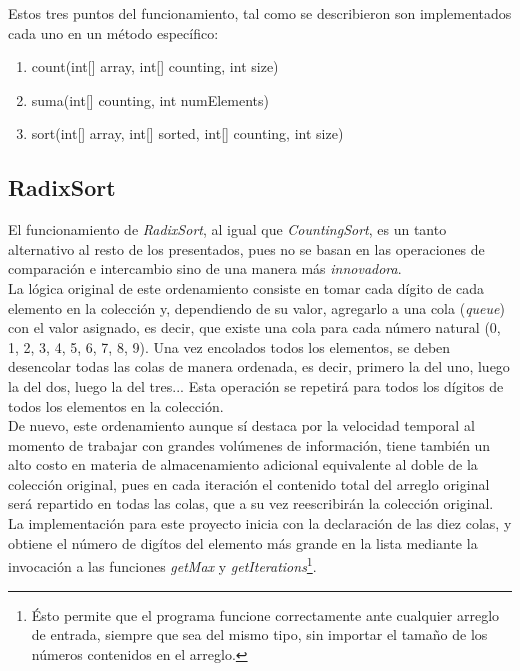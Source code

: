 \documentclass[a4paper,12pt]{article}
\begin{document}
Estos tres puntos del funcionamiento, tal como se describieron son implementados cada uno en un método específico:

\begin{enumerate}
    \item count(int[] array, int[] counting, int size)
    \item suma(int[] counting, int numElements)
    \item sort(int[] array, int[] sorted, int[] counting, int size)
\end{enumerate}

\subsection{RadixSort}

El funcionamiento de \textit{RadixSort}, al igual que \textit{CountingSort}, es un tanto alternativo al resto de los presentados, pues no se basan en las operaciones de comparación e intercambio sino de una manera más \textit{innovadora}.\\

La lógica original de este ordenamiento consiste en tomar cada dígito de cada elemento en la colección y, dependiendo de su valor, agregarlo a una cola (\textit{queue}) con el valor asignado, es decir, que existe una cola para cada número natural (0, 1, 2, 3, 4, 5, 6, 7, 8, 9). Una vez encolados todos los elementos, se deben desencolar todas las colas de manera ordenada, es decir, primero la del uno, luego la del dos, luego la del tres... Esta operación se repetirá para todos los dígitos de todos los elementos en la colección.\\

De nuevo, este ordenamiento aunque sí destaca por la velocidad temporal al momento de trabajar con grandes volúmenes de información, tiene también un alto costo en materia de almacenamiento adicional equivalente al doble de la colección original, pues en cada iteración el contenido total del arreglo original será repartido en todas las colas, que a su vez reescribirán la colección original.\\

La implementación para este proyecto inicia con la declaración de las diez colas, y obtiene el número de digítos del elemento más grande en la lista mediante la invocación a las funciones \textit{getMax} y \textit{getIterations}\footnote{Ésto permite que el programa funcione correctamente ante cualquier arreglo de entrada, siempre que sea del mismo tipo, sin importar el tamaño de los números contenidos en el arreglo.}.
\end{document}
